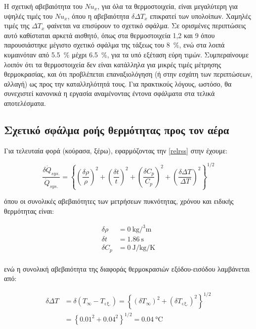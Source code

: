 Η σχετική αβεβαιότητα του $Nu_x$, για όλα τα θερμοστοιχεία, είναι μεγαλύτερη για υψηλές τιμές του $Nu_x$, όπου η αβεβαιότητα $\delta \Delta T_x$ επικρατεί των υπολοίπων. Χαμηλές τιμές της $\Delta T_x$ φαίνεται να επισύρουν το σχετικό σφάλμα. Σε ορισμένες περιπτώσεις αυτό καθίσταται αρκετά αισθητό, όπως στα θερμοστοιχεία 1,2 και 9 όπου παρουσιάστηκε μέγιστο σχετικό σφάλμα της τάξεως του \qty{8}{\percent}, ενώ στα λοιπά κυμαινόταν από \qty{5.5}{\percent} μέχρι \qty{6.5}{\percent}, για τα υπό εξέταση εύρη τιμών. Συμπεραίνουμε λοιπόν ότι τα θερμοστοιχεία δεν είναι κατάλληλα για μικρές τιμές μέτρησης θερμοκρασίας, και ότι προβλέπεται επαναξιολόγηση (ή στην εσχάτη των περιπτώσεων, αλλαγή) ως προς την καταλληλότητά τους. Για πρακτικούς λόγους, ωστόσο, θα συνεχιστεί κανονικά η εργασία αναμένοντας έντονα σφάλματα στα τελικά αποτελέσματα.

\subsection{Σχετικό σφάλμα ροής θερμότητας προς τον αέρα}

\noindent Για τελευταία φορά (κούρασα, ξέρω), εφαρμόζοντας την \ref{relrss} στην  έχουμε:

\begin{equation*}
\frac{\delta \dot{Q}_{sys.}}{\dot{Q}_{sys.}} = \left\{\left(\frac{\delta \rho}{\rho}\right)^2 + \left(\frac{\delta t}{t}\right)^2 + \left(\frac{\delta C_p}{C_p}\right)^2 + \left(\frac{\delta \Delta T}{\Delta T}\right)^2 \right\} ^ {1/2}
\end{equation*}

\noindent όπου οι συνολικές αβεβαιότητες των μετρήσεων πυκνότητας, χρόνου και ειδικής θερμότητας είναι:

\begin{align*}
\delta \rho &= \qty{0}{\kilo\gram\per\cubed\metre}\\
\delta t &= \qty{1.86}{\second}\\
\delta C_p &= \qty{0}{\joule\per\kilogram\per\kelvin}\\
\end{align*}

\noindent ενώ η συνολική αβεβαιότητα της διαφοράς θερμοκρασιών εξόδου-εισόδου λαμβάνεται από:

\begin{align*}
\delta \Delta T &= \delta \left(T_{\infty} - Τ_{\text{εξ.}}\right) = \left\{\left(\delta T_{\infty}\right) ^ 2 + \left(\delta Τ_{\text{εξ.}}\right)^2 \right\} ^ {1/2}\\
 &= \left\{0.01 ^ 2 + 0.04 ^ 2\right\} ^ {1/2} = \qty{0.04}{\degreeCelsius}
\end{align*}

